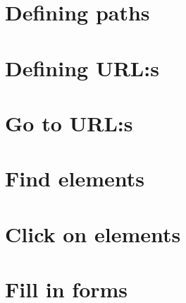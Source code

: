 \documentclass[a4paper,11pt]{kth-mag}
\begin{document}
\section{Defining paths}

\section{Defining URL:s}

\section{Go to URL:s}



\section{Find elements}





\section{Click on elements}


\section{Fill in forms}







\end{document}
